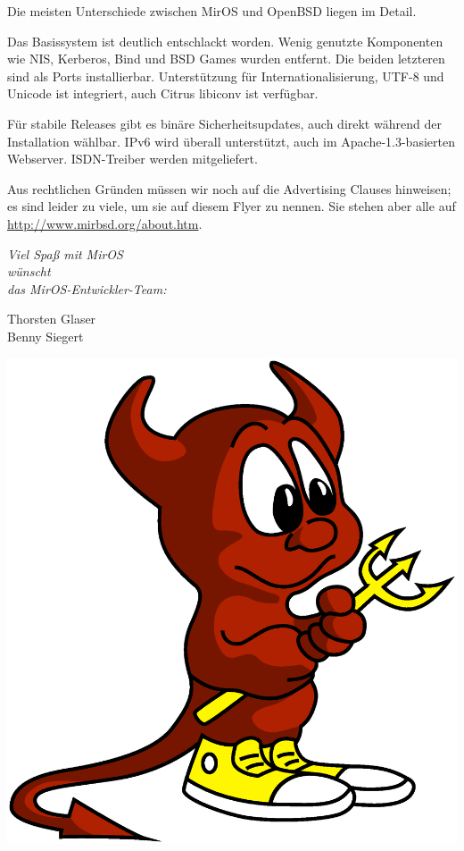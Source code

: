 \documentclass[a4paper,landscape,11pt,notumble]{leaflet}
\begin{document}
Die meisten Unterschiede zwischen MirOS und OpenBSD liegen im Detail.

Das Basissystem ist deutlich entschlackt worden. Wenig genutzte Komponenten wie NIS, Kerberos, Bind und BSD Games wurden entfernt. Die beiden letzteren sind als Ports installierbar. Unterstützung für Internationalisierung, UTF-8 und Unicode ist integriert, auch Citrus libiconv ist verfügbar.

Für stabile Releases gibt es binäre Sicherheitsupdates, auch direkt während der Installation wählbar.
IPv6 wird überall unterstützt, auch im Apache-1.3-basierten Webserver. ISDN-Treiber werden mitgeliefert.

Aus rechtlichen Gründen müssen wir noch auf die Advertising Clauses hinweisen; es sind leider zu viele, um sie auf diesem Flyer zu nennen. Sie stehen aber alle
auf \url{http://www.mirbsd.org/about.htm}.

\newpage


\graybox\par
\begin{center}
\vspace{3ex}
{\Large\itshape
Viel Spaß mit MirOS\\
wünscht\\
das MirOS-Entwickler-Team:\par\medskip
\color{darkred}%
Thorsten Glaser\\
Benny Siegert\par
}

\vfill

\includegraphics[width=0.75\columnwidth]{img/bsdaemon}

\vfill%
\end{center}%
\end{document}
